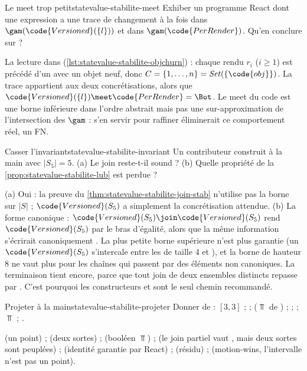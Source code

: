 \begin{exercice}{Le meet trop petit}{statevalue-stabilite-meet}
  Exhiber un programme React dont une expression a une trace de changement
  à la fois dans $\gam(\code{Versioned}(\{l\}))$ et dans
  $\gam(\code{PerRender})$. Qu'en conclure sur  ?
\end{exercice}
\begin{solution}
  La lecture  dans  (\cref{lst:statevalue-stabilite-objchurn}) :
  chaque rendu $r_i$ ($i \ge 1$) est précédé d'un  avec un objet
  neuf, donc $C = \{1,\dots,n\} = \mathit{Set}(\{\code{obj}\})$. La trace
  appartient aux deux concrétisations, alors que $\code{Versioned}(\{l\})
  \meet \code{PerRender} = \Bot$. Le meet du code est une borne inférieure
  dans l'ordre abstrait mais pas une sur-approximation de l'intersection des
  $\gam$ : s'en servir pour raffiner éliminerait ce comportement réel, un FN.
\end{solution}

\begin{exercice}{Casser l'invariant}{statevalue-stabilite-invariant}
  Un contributeur construit à la main  avec
  $|S_5| = 5$. (a) Le join reste-t-il sound ? (b) Quelle propriété de la
  \cref{prop:statevalue-stabilite-lub} est perdue ?
\end{exercice}
\begin{solution}
  (a) Oui : la preuve du \cref{thm:statevalue-stabilite-join-stab} n'utilise
  pas la borne sur $|S|$ ; $\code{Versioned}(S_5)$ a simplement la
  concrétisation attendue. (b) La forme canonique : $\code{Versioned}(S_5)
  \join \code{Versioned}(S_5)$ rend $\code{Versioned}(S_5)$ par le bras
  d'égalité, alors que la même information s'écrirait canoniquement
  . La plus petite borne supérieure n'est plus garantie
  (un $\code{Versioned}(S_5)$ s'intercale entre les  de
  taille 4 et ), et la borne de hauteur 8 ne vaut plus
  pour les chaînes qui passent par des éléments non canoniques. La
  terminaison tient encore, parce que tout join de deux ensembles distincts
  repasse par . C'est pourquoi les constructeurs  et 
  sont le seul chemin recommandé.
\end{solution}

\begin{exercice}{Projeter à la main}{statevalue-stabilite-projeter}
  Donner  de : $[3,3]$ ;
   ;  ($\Top$ de ) ;
   ;  ; $\Top$ ;
  .
\end{exercice}
\begin{solution}
   (un point) ;  (deux sortes) ; 
  (booléen $\Top$) ;  (le join partiel vaut
  , mais deux sortes sont peuplées) ; 
  (identité garantie par React) ;  (résidu) ; 
  (motion-wins, l'intervalle n'est pas un point).
\end{solution}

